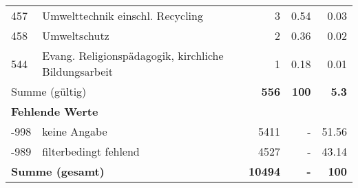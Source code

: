 \begin{longtable}{lXrrr}
        457 & \multicolumn{1}{X}{Umwelttechnik einschl. Recycling} & %
          \num{3} &
          \num[round-mode=places,round-precision=2]{0,54} &
          \num[round-mode=places,round-precision=2]{0,03} \\

        458 & \multicolumn{1}{X}{Umweltschutz} & %
          \num{2} &
          \num[round-mode=places,round-precision=2]{0,36} &
          \num[round-mode=places,round-precision=2]{0,02} \\

        544 & \multicolumn{1}{X}{Evang. Religionspädagogik, kirchliche Bildungsarbeit} & %
          \num{1} &
          \num[round-mode=places,round-precision=2]{0,18} &
          \num[round-mode=places,round-precision=2]{0,01} \\

     \midrule
     \multicolumn{2}{l}{Summe (gültig)} &
       \textbf{\num{556}} &
     \textbf{100} &
       \textbf{\num[round-mode=places,round-precision=2]{5,3}} \\
     \multicolumn{5}{l}{\textbf{Fehlende Werte}}\\
       -998 &
       keine Angabe &
         \num{5411} &
        - &
         \num[round-mode=places,round-precision=2]{51,56} \\
       -989 &
       filterbedingt fehlend &
         \num{4527} &
        - &
         \num[round-mode=places,round-precision=2]{43,14} \\
     \midrule
     \multicolumn{2}{l}{\textbf{Summe (gesamt)}} &
          \textbf{\num{10494}} &
        \textbf{-} &
        \textbf{100} \\
     \bottomrule
     \end{longtable}
     
